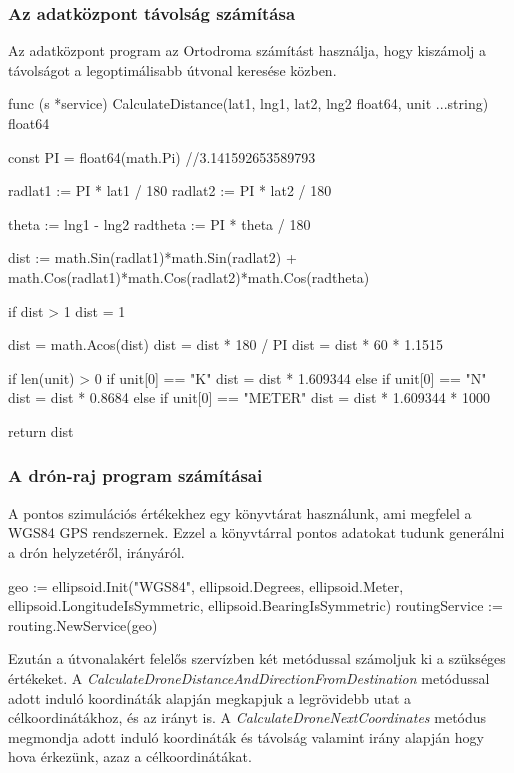 \subsubsection{Az adatközpont távolság számítása}
Az adatközpont program az Ortodroma számítást használja, hogy kiszámolj a távolságot a legoptimálisabb útvonal keresése közben.
\begin{python}
    func (s *service) CalculateDistance(lat1, lng1, lat2,
    lng2 float64, unit ...string) float64 {
        const PI = float64(math.Pi) //3.141592653589793

        radlat1 := PI * lat1 / 180
        radlat2 := PI * lat2 / 180

        theta := lng1 - lng2
        radtheta := PI * theta / 180

        dist := math.Sin(radlat1)*math.Sin(radlat2) +
        math.Cos(radlat1)*math.Cos(radlat2)*math.Cos(radtheta)

        if dist > 1 {
            dist = 1
        }

        dist = math.Acos(dist)
        dist = dist * 180 / PI
        dist = dist * 60 * 1.1515

        if len(unit) > 0 {
            if unit[0] == "K" {
                dist = dist * 1.609344
            } else if unit[0] == "N" {
                dist = dist * 0.8684
            } else if unit[0] == "METER" {
                dist = dist * 1.609344 * 1000
            }
        }

        return dist
    }
\end{python}
\subsubsection{A drón-raj program számításai}
A pontos szimulációs értékekhez egy könyvtárat használunk, ami megfelel a WGS84 GPS rendszernek.
Ezzel a könyvtárral pontos adatokat tudunk generálni a drón helyzetéről, irányáról.

\begin{python}

    geo := ellipsoid.Init("WGS84", ellipsoid.Degrees, ellipsoid.Meter,
    ellipsoid.LongitudeIsSymmetric, ellipsoid.BearingIsSymmetric)
    routingService := routing.NewService(geo)

\end{python}

Ezután a útvonalakért felelős szervízben két metódussal számoljuk ki a szükséges értékeket.
A \textit{CalculateDroneDistanceAndDirectionFromDestination} metódussal adott induló koordináták alapján megkapjuk a legrövidebb utat a célkoordinátákhoz, és az irányt is.
A \textit{CalculateDroneNextCoordinates} metódus megmondja adott induló koordináták és távolság valamint irány alapján hogy hova érkezünk, azaz a célkoordinátákat.

